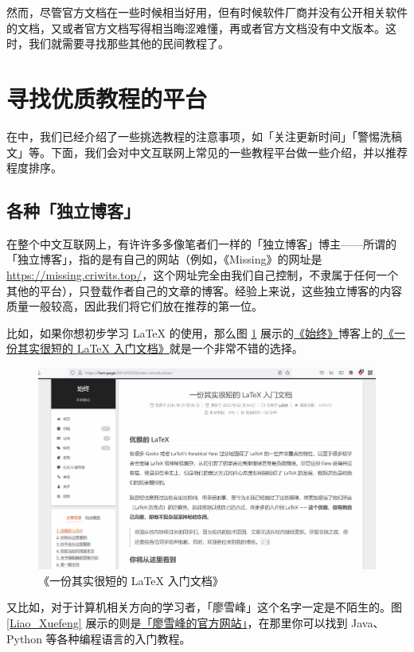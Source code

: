 然而，尽管官方文档在一些时候相当好用，但有时候软件厂商并没有公开相关软件的文档，又或者官方文档写得相当晦涩难懂，再或者官方文档没有中文版本。这时，我们就需要寻找那些其他的民间教程了。

\section{寻找优质教程的平台}

在中，我们已经介绍了一些挑选教程的注意事项，如「关注更新时间」「警惕洗稿文」等。下面，我们会对中文互联网上常见的一些教程平台做一些介绍，并以推荐程度排序。

\subsection{各种「独立博客」}

在整个中文互联网上，有许许多多像笔者们一样的「独立博客」博主——所谓的「独立博客」，指的是有自己的网站（例如，《Missing》的网址是 \url{https://missing.criwits.top/}，这个网址完全由我们自己控制，不隶属于任何一个其他的平台），只登载作者自己的文章的博客。经验上来说，这些独立博客的内容质量一般较高，因此我们将它们放在推荐的第一位。

比如，如果你想初步学习 \LaTeX{} 的使用，那么图 \ref{Liam_LaTeX_tutorial} 展示的\href{https://liam.page}{《始终》}博客上的\href{https://liam.page/2014/09/08/latex-introduction/}{《一份其实很短的 \LaTeX{} 入门文档》}就是一个非常不错的选择。

\begin{figure}[htb!]
  \centering
  \includegraphics[width=12cm]{assets/Liam_LaTeX_tutorial.jpg}
  \caption{《一份其实很短的 \LaTeX{} 入门文档》}
  \label{Liam_LaTeX_tutorial}
\end{figure}

又比如，对于计算机相关方向的学习者，「廖雪峰」这个名字一定是不陌生的。图 \ref{Liao_Xuefeng} 展示的则是\href{https://www.liaoxuefeng.com/}{「廖雪峰的官方网站」}，在那里你可以找到 Java、Python 等各种编程语言的入门教程。

